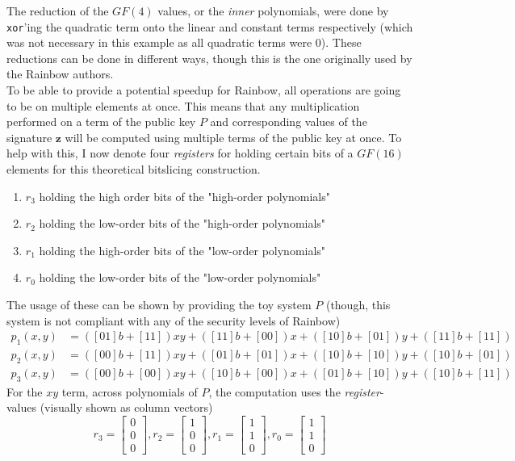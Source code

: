The reduction of the $GF(4)$ values, or the \textit{inner} polynomials, were done by \texttt{xor}'ing the quadratic term onto the linear and constant terms respectively (which was not necessary in this example as all quadratic terms were 0). These reductions can be done in different ways, though this is the one originally used by the Rainbow authors.
\medskip\\
To be able to provide a potential speedup for Rainbow, all operations are going to be on multiple elements at once. This means that any multiplication performed on a term of the public key $P$ and corresponding values of the signature $\textbf{z}$ will be computed using multiple terms of the public key at once. To help with this, I now denote four \emph{registers} for holding certain bits of a $GF(16)$ elements for this theoretical bitslicing construction.
\begin{enumerate}
    \item $r_3$ holding the high order bits of the "high-order polynomials"
    \item $r_2$ holding the low-order bits of the "high-order polynomials"
    \item $r_1$ holding the high-order bits of the "low-order polynomials"
    \item $r_0$ holding the low-order bits of the "low-order polynomials"
\end{enumerate}
The usage of these can be shown by providing the toy system $P$ (though, this system is not compliant with any of the security levels of Rainbow)
\begin{equation*}
    \begin{split}
        p_1(x,y) &= ([01]b + [11]) xy + ([11]b + [00]) x + ([10]b + [01]) y + ([11]b + [11])\\
        p_2(x,y) &= ([00]b + [11]) xy + ([01]b + [01]) x + ([10]b + [10]) y + ([10]b + [01])\\
        p_3(x,y) &= ([00]b + [00]) xy + ([10]b + [00]) x + ([01]b + [10]) y + ([10]b + [11])
    \end{split}
\end{equation*}
For the $xy$ term, across polynomials of $P$, the computation uses the \emph{register}-values (visually shown as column vectors)
$$
    r_3 = \begin{bmatrix} 0\\ 0\\ 0 \end{bmatrix}, r_2 = \begin{bmatrix} 1\\ 0\\ 0 \end{bmatrix}, r_1 = \begin{bmatrix} 1\\ 1\\ 0 \end{bmatrix}, r_0 = \begin{bmatrix} 1\\ 1\\ 0 \end{bmatrix}
$$
